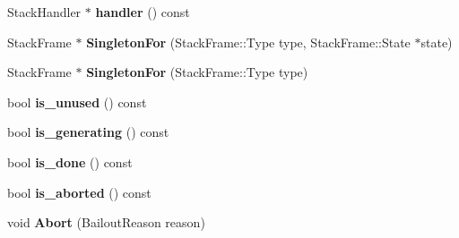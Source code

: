 \begin{DoxyCompactItemize}
\item 
\hypertarget{classv8_1_1internal_1_1_b_a_s_e___e_m_b_e_d_d_e_d_a5ad5d39de125dd9706a54356457900a2}{}Stack\+Handler $\ast$ {\bfseries handler} () const \label{classv8_1_1internal_1_1_b_a_s_e___e_m_b_e_d_d_e_d_a5ad5d39de125dd9706a54356457900a2}

\item 
\hypertarget{classv8_1_1internal_1_1_b_a_s_e___e_m_b_e_d_d_e_d_ac0563273aa277f823c337fd2a2a33883}{}Stack\+Frame $\ast$ {\bfseries Singleton\+For} (Stack\+Frame\+::\+Type type, Stack\+Frame\+::\+State $\ast$state)\label{classv8_1_1internal_1_1_b_a_s_e___e_m_b_e_d_d_e_d_ac0563273aa277f823c337fd2a2a33883}

\item 
\hypertarget{classv8_1_1internal_1_1_b_a_s_e___e_m_b_e_d_d_e_d_ad29172ee3b0bd0da60aac9ab262c4735}{}Stack\+Frame $\ast$ {\bfseries Singleton\+For} (Stack\+Frame\+::\+Type type)\label{classv8_1_1internal_1_1_b_a_s_e___e_m_b_e_d_d_e_d_ad29172ee3b0bd0da60aac9ab262c4735}

\item 
\hypertarget{classv8_1_1internal_1_1_b_a_s_e___e_m_b_e_d_d_e_d_afa38f3c187668ae20f3e9d28c93b0083}{}bool {\bfseries is\+\_\+unused} () const \label{classv8_1_1internal_1_1_b_a_s_e___e_m_b_e_d_d_e_d_afa38f3c187668ae20f3e9d28c93b0083}

\item 
\hypertarget{classv8_1_1internal_1_1_b_a_s_e___e_m_b_e_d_d_e_d_a9724c04e305c8c1fc3c6fa91cc2153b9}{}bool {\bfseries is\+\_\+generating} () const \label{classv8_1_1internal_1_1_b_a_s_e___e_m_b_e_d_d_e_d_a9724c04e305c8c1fc3c6fa91cc2153b9}

\item 
\hypertarget{classv8_1_1internal_1_1_b_a_s_e___e_m_b_e_d_d_e_d_ae48e47aca20d6a87f31e6f12d666f3af}{}bool {\bfseries is\+\_\+done} () const \label{classv8_1_1internal_1_1_b_a_s_e___e_m_b_e_d_d_e_d_ae48e47aca20d6a87f31e6f12d666f3af}

\item 
\hypertarget{classv8_1_1internal_1_1_b_a_s_e___e_m_b_e_d_d_e_d_a8608d3cb9b1b65d7d58fcec7a50baa02}{}bool {\bfseries is\+\_\+aborted} () const \label{classv8_1_1internal_1_1_b_a_s_e___e_m_b_e_d_d_e_d_a8608d3cb9b1b65d7d58fcec7a50baa02}

\item 
\hypertarget{classv8_1_1internal_1_1_b_a_s_e___e_m_b_e_d_d_e_d_a83154f669f8b0e09d2d7c29c063283cb}{}void {\bfseries Abort} (Bailout\+Reason reason)\label{classv8_1_1internal_1_1_b_a_s_e___e_m_b_e_d_d_e_d_a83154f669f8b0e09d2d7c29c063283cb}


\end{DoxyCompactItemize}
